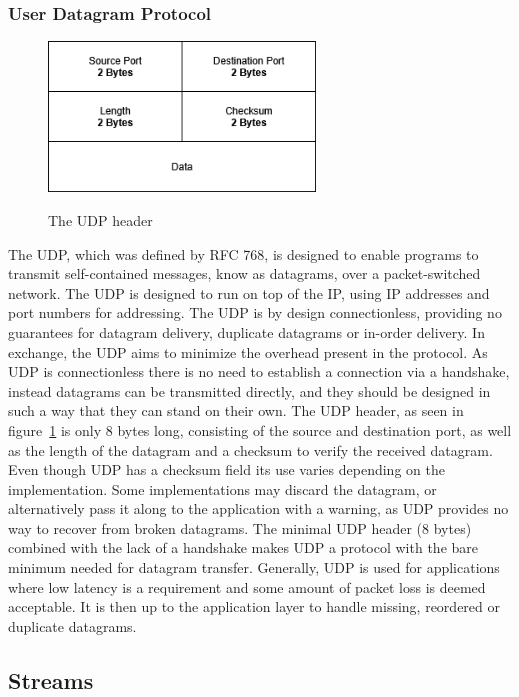 \documentclass[english, 12pt, a4paper, elec, utf8, a-2b, online]{aaltothesis}
\begin{document}
\subsubsection{User Datagram Protocol \label{UDP}}
\label{sec:udp}
\begin{figure}[b]
	\centering
	\includegraphics[alt={A block diagram of the UDP header format, detailing its fields and their sizes.}, height=4cm]{./images/udp_header.png}
	\caption{The UDP header}
	\label{fig:udp_header}
\end{figure}
The UDP, which was defined by RFC 768, is designed to
enable programs to transmit self-contained messages, know as datagrams, over a
packet-switched network. The UDP is designed to run on top of the IP\cite{rfc791},
using IP addresses and port numbers for addressing. The UDP is by design connectionless,
providing no guarantees for datagram delivery, duplicate datagrams or in-order
delivery. In exchange, the UDP aims to minimize the overhead present in the protocol.
As UDP is connectionless there is no need to establish a connection via a handshake,
instead datagrams can be transmitted directly, and they should be designed in
such a way that they can stand on their own. The UDP header, as seen in figure~\ref{fig:udp_header}
is only 8 bytes long,
consisting of the source and destination port, as well as the length of the datagram
and a checksum to verify the received datagram\cite{rfc768}. Even though UDP has
a checksum field its use varies depending on the implementation. Some implementations
may discard the datagram, or alternatively pass it along to the application with a 
warning, as UDP provides no way to recover from broken datagrams\cite{compute_rnetworking}. The minimal UDP
header (8 bytes) combined with the lack of a handshake makes UDP a protocol with
the bare minimum needed for datagram transfer.
Generally, UDP is used for applications where low latency is a requirement and some
amount of packet loss is deemed acceptable. It is then up to the application layer to
handle missing, reordered or duplicate datagrams.

\subsection{Streams}
\end{document}
